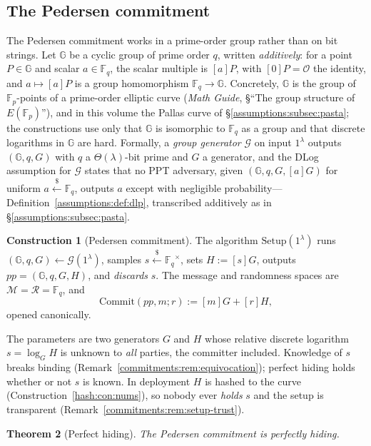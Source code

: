 \documentclass[11pt,a4paper]{article}
\newtheorem{theorem}{Theorem}[section]
\theoremstyle{definition}
\newtheorem{construction}[theorem]{Construction}
\theoremstyle{remark}
\newcommand{\G}{\ensuremath{\mathbb{G}}}
\newcommand{\Fp}{\ensuremath{\mathbb{F}_{p}}}
\newcommand{\Fq}{\ensuremath{\mathbb{F}_{q}}}
\begin{document}
\subsection{The Pedersen commitment}\label{commitments:subsec:pedersen}

The Pedersen commitment works in a prime-order group rather than on bit
strings. Let \(\G\) be a cyclic group of prime order \(q\), written
\emph{additively}: for a point \(P \in \G\) and
scalar \(a \in \Fq\), the scalar multiple is \([a]P\), with
\([0]P = \mathcal O\) the identity, and
\(a \mapsto [a]P\) is a group homomorphism \(\Fq \to \G\).
Concretely, \(\G\) is the group of \(\Fp\)-points of a prime-order
elliptic curve (\emph{Math Guide}, \S``The group structure of
\(E(\Fp)\)''), and in this volume the Pallas curve of
\S\ref{assumptions:subsec:pasta}; the constructions use only that
\(\G\) is isomorphic to \(\Fq\) as a group and that discrete logarithms
in \(\G\) are hard. Formally, a
\emph{group generator} \(\mathcal G\) on input \(1^\lambda\) outputs
\((\G, q, G)\) with \(q\) a \(\Theta(\lambda)\)-bit prime and \(G\) a
generator, and the DLog assumption for \(\mathcal G\) states that no
PPT adversary, given \((\G, q, G, [a]G)\) for uniform
\(a \xleftarrow{\$} \Fq\), outputs \(a\) except with negligible
probability---Definition~\ref{assumptions:def:dlp}, transcribed
additively as in \S\ref{assumptions:subsec:pasta}.

\begin{construction}[Pedersen commitment]\label{commitments:def:pedersen}
The algorithm \(\mathrm{Setup}(1^\lambda)\) runs
\((\G, q, G) \gets \mathcal G(1^\lambda)\), samples
\(s \xleftarrow{\$} \Fq^{\times}\), sets \(H := [s]G\), outputs
\(pp = (\G, q, G, H)\), and \emph{discards} \(s\). The message and
randomness spaces are \(\mathcal M = \mathcal R = \Fq\), and
\[
\mathrm{Commit}(pp, m; r) := [m]G + [r]H,
\]
opened canonically.
\end{construction}

The parameters are two generators \(G\) and \(H\) whose relative
discrete logarithm \(s = \log_G H\) is unknown to \emph{all}
parties, the committer included. Knowledge of \(s\) breaks binding
(Remark~\ref{commitments:rem:equivocation}); perfect hiding holds
whether or not \(s\) is known. In deployment \(H\) is hashed to the curve
(Construction~\ref{hash:con:nums}), so nobody ever \emph{holds} \(s\)
and the setup is transparent (Remark~\ref{commitments:rem:setup-trust}).

\begin{theorem}[Perfect hiding]\label{commitments:thm:pedersen-hiding}
The Pedersen commitment is perfectly hiding.
\end{theorem}
\end{document}
